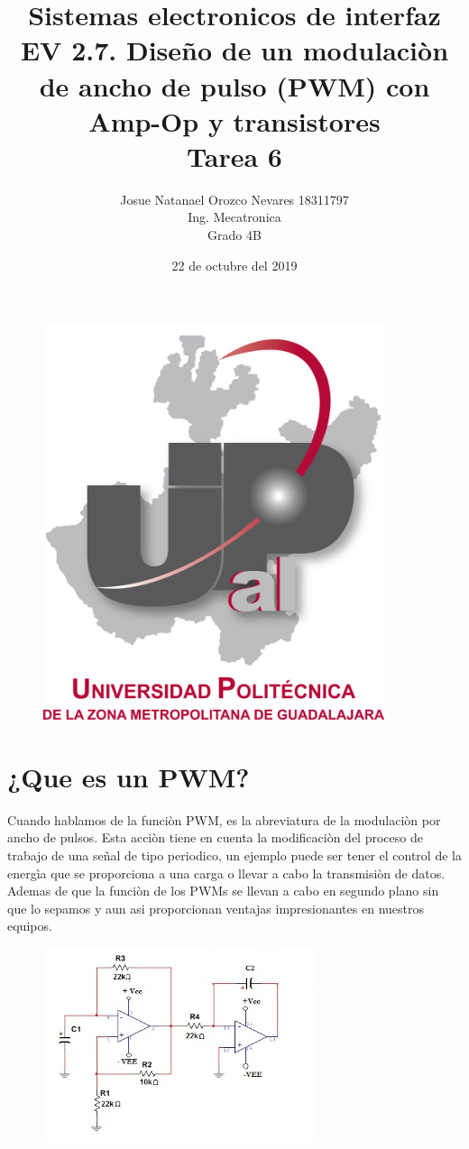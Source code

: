 \documentclass[12pt,a4paper]{article}
\begin{document}
\title{\textbf{Sistemas electronicos de interfaz\\EV 2.7. Diseño de un modulaciòn de ancho de pulso (PWM) con Amp-Op y transistores\\Tarea 6}}
\author{Josue Natanael Orozco Nevares 18311797\\Ing. Mecatronica\\Grado 4B}
\date{22 de octubre del 2019}
\maketitle
\begin{figure}[h!]
\centering
\includegraphics[width=10cm]{UPCDLZMDG5783-logo.png} 
\end{figure}
\newpage

\section{¿Que es un PWM?}
Cuando hablamos de la funciòn PWM, es la abreviatura de la modulaciòn por ancho de pulsos. Esta acciòn tiene en cuenta la modificaciòn del proceso de trabajo de una señal de tipo periodico, un ejemplo puede ser tener el control de la energìa que se proporciona a una carga o llevar a cabo la transmisiòn de datos. Ademas de que la funciòn de los PWMs se llevan a cabo en segundo plano sin que lo sepamos y aun asi proporcionan ventajas impresionantes en nuestros equipos.

\begin{figure}[h!]
\centering
\includegraphics[width=8cm]{nuevo-y-mejorar.jpg} 
\end{figure}
\end{document}
